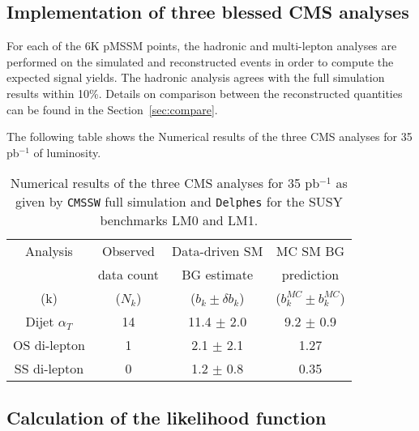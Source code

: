 \subsection{Implementation of three blessed CMS analyses}

For each of the 6K pMSSM points, the hadronic and multi-lepton analyses are performed on the simulated and reconstructed 
events in order to compute the expected signal yields. The hadronic analysis agrees with the full simulation results within 10\%. Details on 
comparison between the reconstructed quantities can be found in the Section~\ref{sec:compare}.


The following table shows the Numerical results of the three CMS analyses for 35 pb$^{-1}$ of luminosity.

\begin{table}[htdp]
\caption{Numerical results of the three CMS analyses for 35 pb$^{-1}$ as given by {\tt CMSSW} full simulation and {\tt Delphes} for the SUSY benchmarks LM0 and LM1.}
\begin{center}
\begin{tabular}{|c|c|c|c|}
\hline
Analysis & Observed  & Data-driven SM & MC SM BG \\
              & data count & BG estimate      & prediction    \\
(k)          & ($N_k$)     & ($b_k \pm \delta b_k$) & ($b_k^{MC} \pm b_k^{MC}$) \\
\hline              
Dijet $\alpha_T$ & 14 & 11.4 $\pm$ 2.0 & 9.2 $\pm$ 0.9 \\
OS di-lepton & 1 & 2.1 $\pm$ 2.1 & 1.27 \\
SS di-lepton & 0 & 1.2 $\pm$ 0.8 & 0.35 \\
\hline
\end{tabular}
\end{center}
\label{default}
\end{table}%


\subsection{Calculation of the likelihood function}

